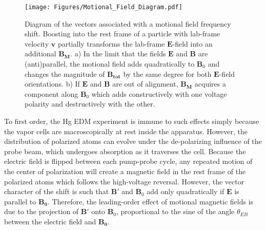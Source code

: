 \documentclass [10pt, twoside] {uwthesis}[2012/04/02]
\begin{document}
\begin{figure}
\begin{center}
\texttt{[image: Figures/Motional\_Field\_Diagram.pdf]}
\end{center}
\caption[Diagram of motional field frequency shift]%
{\narrower Diagram of the vectors associated with a motional field frequency shift. Boosting into the rest frame of a particle with lab-frame velocity $\mathbf{v}$ partially transforms the lab-frame $\mathbf{E}$-field into an additional $\mathbf{B_M}$. a) In the limit that the fields $\mathbf{E}$ and $\mathbf{B}$ are (anti)parallel, the motional field adds quadratically to $\mathbf{B}_0$ and changes the magnitude of $\mathbf{B_{tot}}$ by the same degree for both $\mathbf{E}$-field orientations. b) If $\mathbf{E}$ and $\mathbf{B}$ are out of alignment, $\mathbf{B_M}$ acquires a component along $\mathbf{B}_0$ which adds constructively with one voltage polarity and destructively with the other.}
\label{MotionalFieldDiagram}
\end{figure}

To first order, the Hg EDM experiment is immune to such effects simply because the vapor cells are macroscopically at rest inside the apparatus. However, the distribution of polarized atoms can evolve under the de-polarizing influence of the probe beam, which undergoes absorption as it traverses the cell. Because the electric field is flipped between each pump-probe cycle, any repeated motion of the center of polarization will create a magnetic field in the rest frame of the polarized atoms which follows the high-voltage reversal. However, the vector character of the shift is such that $\mathbf{B}'$ and $\mathbf{B}_0$ add only quadratically if $\mathbf{E}$ is parallel to $\mathbf{B_0}.$ Therefore, the leading-order effect of motional magnetic fields is due to the projection of $\mathbf{B}'$ onto $\mathbf{B}_0$, proportional to the sine of the angle $\theta_{EB}$ between the electric field and $\mathbf{B_0}.$
\end{document}
